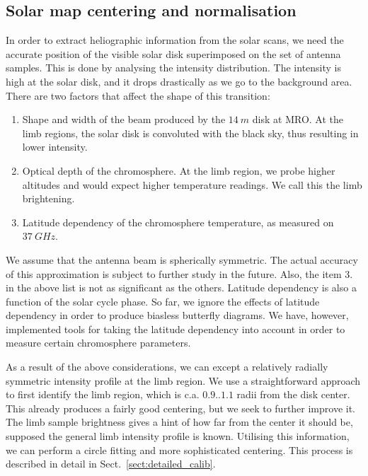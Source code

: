 \documentclass{aa}
\begin{document}
  \subsection{Solar map centering and normalisation} \label{sect:disk}

In order to extract heliographic information from the solar scans, we need the accurate position of the visible solar disk superimposed on the set of antenna samples. This is done by analysing the intensity distribution. The intensity is high at the solar disk, and it drops drastically as we go to the background area. There are two factors that affect the shape of this transition:
\begin{enumerate}
\item Shape and width of the beam produced by the $\SI{14}{m}$ disk at MRO. At the limb regions, the solar disk is convoluted with the black sky, thus resulting in lower intensity.
\item Optical depth of the chromosphere. At the limb region, we probe higher altitudes and would expect higher temperature readings. We call this the limb brightening.
\item Latitude dependency of the chromosphere temperature, as measured on $\SI{37}{GHz}$.
\end{enumerate}

We assume that the antenna beam is spherically symmetric. The actual accuracy of this approximation is subject to 
further study in the future. Also, the item 3. in the above list is not as significant as the others. Latitude 
dependency is also a function of the solar cycle phase. So far, we ignore the effects of latitude dependency in order to 
produce biasless butterfly diagrams. We have, however, implemented tools for taking the latitude dependency into account 
in order to measure certain chromosphere parameters.

As a result of the above considerations, we can except a relatively radially symmetric intensity profile at the limb 
region. We use a straightforward approach to first identify the limb region, which is c.a. $0.9 .. 1.1$ radii from the 
disk center. This already produces a fairly good centering, but we seek to further improve it. The limb sample 
brightness gives a hint of how far from the center it should be, supposed the general limb intensity profile is known. 
Utilising this information, we can perform a circle fitting and more sophisticated centering. This process is described 
in detail in Sect.~\ref{sect:detailed_calib}.
\end{document}
